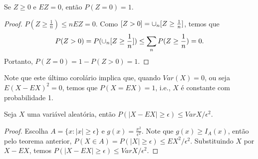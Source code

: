 \begin{frame}
%
\begin{corol}
Se $Z\geq 0$ e $EZ=0$, então $P(Z=0)=1$.
\end{corol}
%
\begin{proof}
$P(Z\geq \frac{1}{n})\leq nEZ=0$. Como $[Z>0]=\cup_n[Z\geq \frac{1}{n}]$, temos que
$$P(Z>0)=P(\cup_n[Z\geq \frac{1}{n}])\leq \sum_n P(Z\geq \frac{1}{n})=0.$$
Portanto, $P(Z=0)=1-P(Z>0)=1$.
\end{proof}
%
Note que este último corolário implica que, quando $Var(X)=0$, ou seja $E(X-EX)^2=0$, temos que $P(X=EX)=1$, i.e., $X$ é constante com probabilidade 1.
%
%
\begin{corol} Seja $X$ uma
variável aleatória, então $P(|X-EX|\geq \epsilon)\leq {Var
X}/{\epsilon^2}$. \end{corol}

\begin{proof} Escolha $A=\{x:|x|\geq \epsilon\}$ e
$g(x)=\frac{x^2}{\epsilon^2}$. Note que $g(x)\geq I_A(x)$, então
pelo teorema anterior, $P(X\in A)=P(|X|\geq \epsilon)\leq
{EX^2}/{\epsilon^2}$. Substituindo $X$ por $X-EX$, temos
$P(|X-EX|\geq \epsilon)\leq {Var X}/{\epsilon^2}$. \end{proof}


\end{frame}
%
